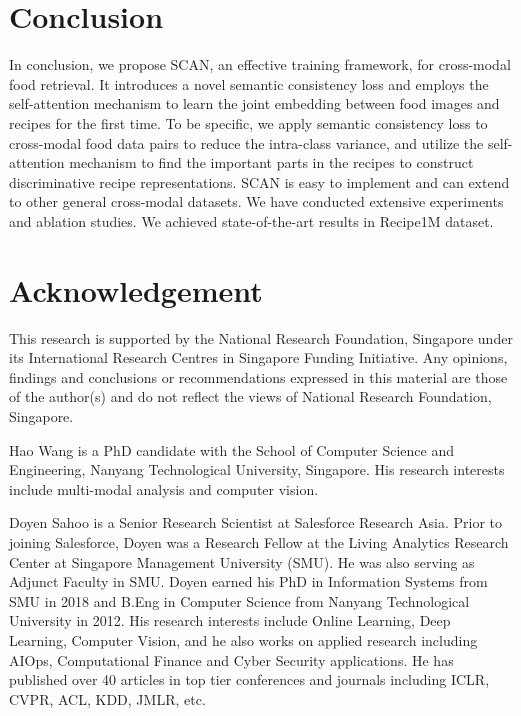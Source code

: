 \documentclass[journal]{IEEEtran}
\begin{document}
\section{Conclusion}

In conclusion, we propose SCAN, an effective training framework, for cross-modal food retrieval. It introduces a novel semantic consistency loss and employs the self-attention mechanism to learn the joint embedding between food images and recipes for the first time. To be specific, we apply semantic consistency loss to cross-modal food data pairs to reduce the intra-class variance, and utilize the self-attention mechanism to find the important parts in the recipes to construct discriminative recipe representations. SCAN is easy to implement and can extend to other general cross-modal datasets. We have conducted extensive experiments and ablation studies. We achieved state-of-the-art results in Recipe1M dataset.

\section*{Acknowledgement}
This research is supported by the National Research Foundation, Singapore under its International Research Centres in Singapore Funding Initiative. Any opinions, findings and conclusions or recommendations expressed in this material are those of the author(s) and do not reflect the views of National Research Foundation, Singapore.


















\newpage

\begin{IEEEbiography}{Hao Wang}
is a PhD candidate with the School of Computer Science and Engineering, Nanyang Technological University, Singapore. His research interests include multi-modal analysis and computer vision.
\end{IEEEbiography}

\begin{IEEEbiography}{Doyen Sahoo}
is a Senior Research Scientist at Salesforce Research Asia. Prior to joining Salesforce, Doyen was a Research Fellow at the Living Analytics Research Center at Singapore Management University (SMU). He was also serving as Adjunct Faculty in SMU. Doyen earned his PhD in Information Systems from SMU in 2018 and B.Eng in Computer Science from Nanyang Technological University in 2012. His research interests include Online Learning, Deep Learning, Computer Vision, and he also works on applied research including AIOps, Computational Finance and Cyber Security applications. He has published over 40 articles in top tier conferences and journals including ICLR, CVPR, ACL, KDD, JMLR, etc.
\end{IEEEbiography}
\end{document}
